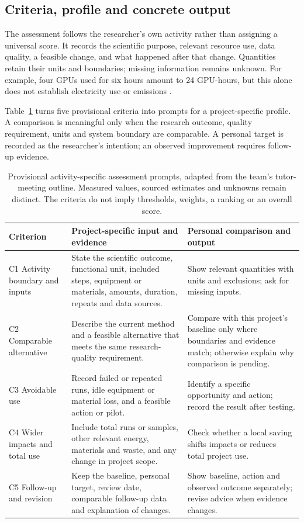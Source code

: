 \documentclass[11pt,a4paper]{article}
\begin{document}
\subsection{Criteria, profile and concrete output}
The assessment follows the researcher's own activity rather than assigning a universal score. It records the scientific purpose, relevant resource use, data quality, a feasible change, and what happened after that change. Quantities retain their units and boundaries; missing information remains unknown. For example, four GPUs used for six hours amount to 24 GPU-hours, but this alone does not establish electricity use or emissions \citep{lacoste2019carbon}.

Table~\ref{tab:phase2-profile} turns five provisional criteria into prompts for a project-specific profile. A comparison is meaningful only when the research outcome, quality requirement, units and system boundary are comparable. A personal target is recorded as the researcher's intention; an observed improvement requires follow-up evidence.
\begin{table}[H]
\centering\small
\begin{tabularx}{\textwidth}{@{}>{\raggedright\arraybackslash}p{}>{\raggedright\arraybackslash}p{}>{\raggedright\arraybackslash}X@{}}
\toprule
Criterion & Project-specific input and evidence & Personal comparison and output \\
\midrule
C1 Activity boundary and inputs & State the scientific outcome, functional unit, included steps, equipment or materials, amounts, duration, repeats and data sources. & Show relevant quantities with units and exclusions; ask for missing inputs. \\
C2 Comparable alternative & Describe the current method and a feasible alternative that meets the same research-quality requirement. & Compare with this project's baseline only where boundaries and evidence match; otherwise explain why comparison is pending. \\
C3 Avoidable use & Record failed or repeated runs, idle equipment or material loss, and a feasible action or pilot. & Identify a specific opportunity and action; record the result after testing. \\
C4 Wider impacts and total use & Include total runs or samples, other relevant energy, materials and waste, and any change in project scope. & Check whether a local saving shifts impacts or reduces total project use. \\
C5 Follow-up and revision & Keep the baseline, personal target, review date, comparable follow-up data and explanation of changes. & Show baseline, action and observed outcome separately; revise advice when evidence changes. \\
\bottomrule
\end{tabularx}
\caption{Provisional activity-specific assessment prompts, adapted from the team's tutor-meeting outline. Measured values, sourced estimates and unknowns remain distinct. The criteria do not imply thresholds, weights, a ranking or an overall score.}
\label{tab:phase2-profile}
\end{table}
\end{document}
